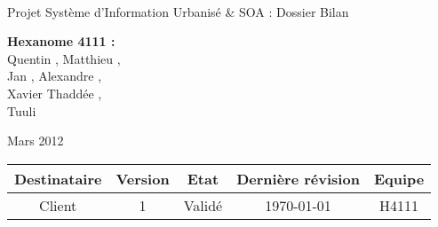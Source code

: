 \documentclass[a4paper]{article}
\begin{document}
\begin{titlepage}
~ 
\vfill
	\begin{center}
		\begin{Huge}
		Projet Système d'Information Urbanisé \& SOA : Dossier Bilan\\ %
		\end{Huge} 
\vfill
		\textbf{Hexanome 4111 :} 
		\\Quentin {}, Matthieu , 
		\\Jan {}, Alexandre , 
		\\Xavier {}Thaddée ,
		\\Tuuli {}
\vfill		
		\begin{Large}
		Mars 2012
		\end{Large}
\vfill
	\begin{tabular}{|c|c|c|c|c|}
 	 \hline
   Destinataire & Version & Etat & Dernière révision & Equipe \\
   \hline
   Client & 1 & Validé & \today & H4111 \\
   \hline
	\end{tabular}
	\end{center}
\vfill
\end{titlepage}
\newpage
\tableofcontents
\newpage


\end{document}
